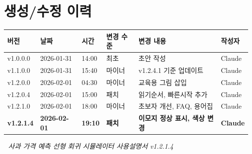 \documentclass[11pt,a4paper]{article}
\begin{document}
\section*{생성/수정 이력}

\begin{center}
\begin{tabular}{llllll}
\toprule
\textbf{버전} & \textbf{날짜} & \textbf{시간} & \textbf{변경 수준} & \textbf{변경 내용} & \textbf{작성자} \\
\midrule
v1.0.0.0 & 2026-01-31 & 14:00 & 최초 & 초안 작성 & Claude \\
v1.1.0.0 & 2026-01-31 & 15:40 & 마이너 & v1.2.4.1 기준 업데이트 & Claude \\
v1.2.0.0 & 2026-02-01 & 04:30 & 마이너 & 교육용 그림 삽입 & Claude \\
v1.2.0.4 & 2026-02-01 & 15:00 & 패치 & 읽기순서, 빠른시작 추가 & Claude \\
v1.2.1.0 & 2026-02-01 & 18:00 & 마이너 & 초보자 개선, FAQ, 용어집 & Claude \\
\textbf{v1.2.1.4} & \textbf{2026-02-01} & \textbf{19:10} & \textbf{패치} & \textbf{이모지 정상 표시, 색상 변경} & \textbf{Claude} \\
\bottomrule
\end{tabular}
\end{center}

\vfill
\begin{center}
\textit{🍎 사과 가격 예측 선형 회귀 시뮬레이터 사용설명서 v1.2.1.4}
\end{center}
\end{document}
